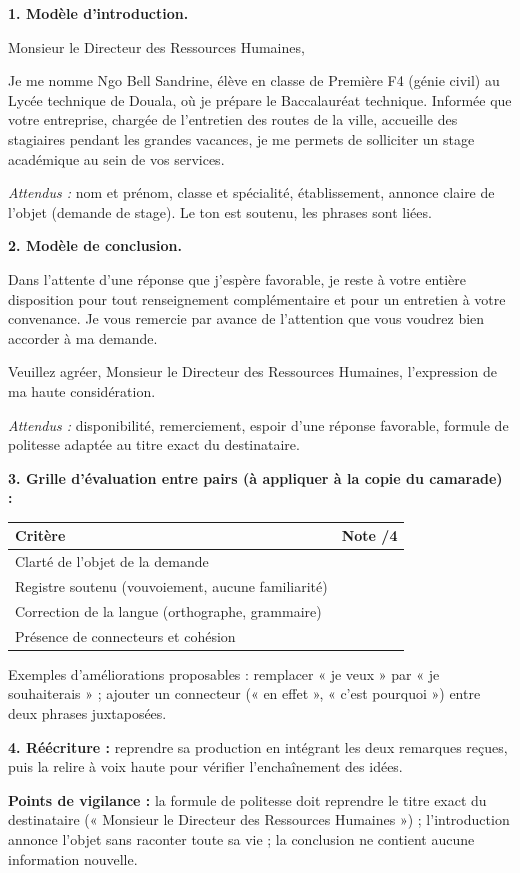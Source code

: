 \documentclass[11pt]{article}
\begin{document}
\begin{corrige}
\textbf{1. Modèle d'introduction.}

Monsieur le Directeur des Ressources Humaines,

Je me nomme Ngo Bell Sandrine, élève en classe de Première F4 (génie civil) au Lycée technique de Douala, où je prépare le Baccalauréat technique. Informée que votre entreprise, chargée de l'entretien des routes de la ville, accueille des stagiaires pendant les grandes vacances, je me permets de solliciter un stage académique au sein de vos services.

\textit{Attendus :} nom et prénom, classe et spécialité, établissement, annonce claire de l'objet (demande de stage). Le ton est soutenu, les phrases sont liées.

\textbf{2. Modèle de conclusion.}

Dans l'attente d'une réponse que j'espère favorable, je reste à votre entière disposition pour tout renseignement complémentaire et pour un entretien à votre convenance. Je vous remercie par avance de l'attention que vous voudrez bien accorder à ma demande.

Veuillez agréer, Monsieur le Directeur des Ressources Humaines, l'expression de ma haute considération.

\textit{Attendus :} disponibilité, remerciement, espoir d'une réponse favorable, formule de politesse adaptée au titre exact du destinataire.

\textbf{3. Grille d'évaluation entre pairs (à appliquer à la copie du camarade) :}
\begin{center}
\begin{tabularx}{\linewidth}{|X|c|}
\hline
\rowcolor{popblueL} Critère & Note /4 \\
\hline
Clarté de l'objet de la demande & \\
\hline
Registre soutenu (vouvoiement, aucune familiarité) & \\
\hline
Correction de la langue (orthographe, grammaire) & \\
\hline
Présence de connecteurs et cohésion & \\
\hline
\end{tabularx}
\end{center}
Exemples d'améliorations proposables : remplacer « je veux » par « je souhaiterais » ; ajouter un connecteur (« en effet », « c'est pourquoi ») entre deux phrases juxtaposées.

\textbf{4. Réécriture :} reprendre sa production en intégrant les deux remarques reçues, puis la relire à voix haute pour vérifier l'enchaînement des idées.

\textbf{Points de vigilance :} la formule de politesse doit reprendre le titre exact du destinataire (« Monsieur le Directeur des Ressources Humaines ») ; l'introduction annonce l'objet sans raconter toute sa vie ; la conclusion ne contient aucune information nouvelle.
\end{corrige}
\end{document}

